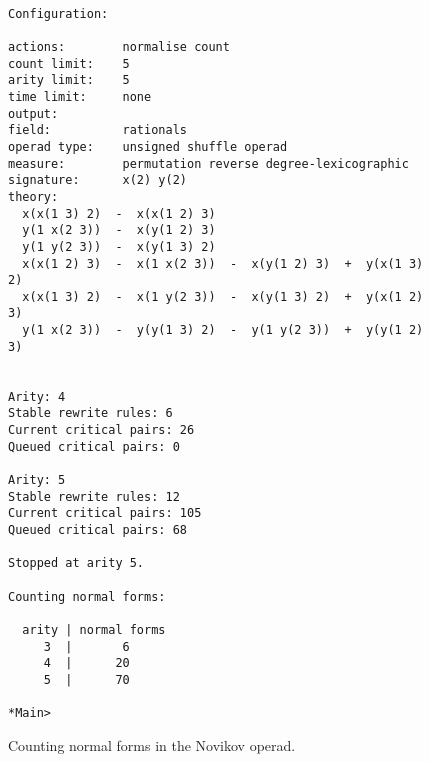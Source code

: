 \begin{figure}

\begin{verbatim}

Configuration:

actions:        normalise count 
count limit:    5
arity limit:    5
time limit:     none
output:         
field:          rationals
operad type:    unsigned shuffle operad
measure:        permutation reverse degree-lexicographic 
signature:      x(2) y(2)
theory:
  x(x(1 3) 2)  -  x(x(1 2) 3)
  y(1 x(2 3))  -  x(y(1 2) 3)
  y(1 y(2 3))  -  x(y(1 3) 2)
  x(x(1 2) 3)  -  x(1 x(2 3))  -  x(y(1 2) 3)  +  y(x(1 3) 2)
  x(x(1 3) 2)  -  x(1 y(2 3))  -  x(y(1 3) 2)  +  y(x(1 2) 3)
  y(1 x(2 3))  -  y(y(1 3) 2)  -  y(1 y(2 3))  +  y(y(1 2) 3)


Arity: 4   
Stable rewrite rules: 6   
Current critical pairs: 26   
Queued critical pairs: 0

Arity: 5   
Stable rewrite rules: 12   
Current critical pairs: 105   
Queued critical pairs: 68

Stopped at arity 5.

Counting normal forms:

  arity | normal forms
     3  |       6
     4  |      20
     5  |      70

*Main> 
\end{verbatim}
\caption{Counting normal forms in the Novikov operad.}
\end{figure}